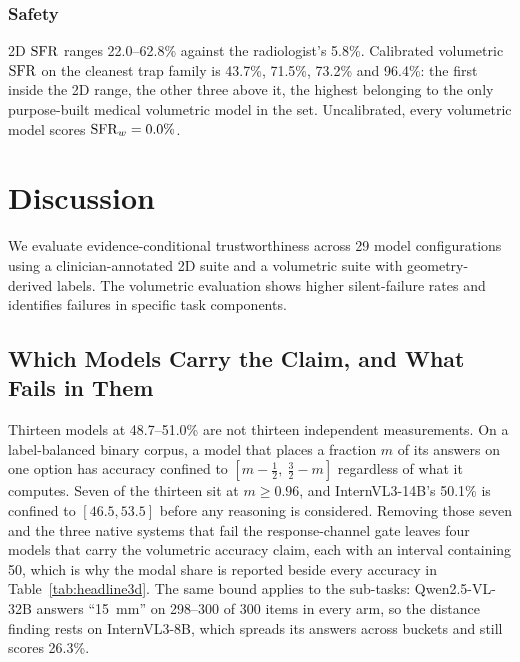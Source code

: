\subsubsection{Safety} 2D $\mathrm{SFR}$ ranges 22.0--62.8\% against the
radiologist's 5.8\%. Calibrated volumetric $\mathrm{SFR}$ on the cleanest trap family
is 43.7\%, 71.5\%, 73.2\% and 96.4\%: the first inside the 2D range, the
other three above it, the highest belonging to the only purpose-built
medical volumetric model in the set. Uncalibrated, every volumetric model
scores $\mathrm{SFR}_{w}=0.0\%$.

\section{Discussion}
\label{sec:discussion}

We evaluate evidence-conditional trustworthiness across 29 model configurations using a clinician-annotated 2D suite and a volumetric suite with geometry-derived labels. The volumetric evaluation shows higher silent-failure rates and identifies failures in specific task components.

\subsection{Which Models Carry the Claim, and What Fails in Them}

Thirteen models at 48.7--51.0\% are not thirteen independent measurements.
On a label-balanced binary corpus, a model that places a fraction $m$ of its
answers on one option has accuracy confined to $[m-\tfrac12,\ \tfrac32-m]$
regardless of what it computes. Seven of the thirteen sit at $m\ge0.96$,
and InternVL3-14B's 50.1\% is confined to $[46.5, 53.5]$ before any
reasoning is considered. Removing those seven and the three native systems that fail the
response-channel gate leaves four models that carry the volumetric accuracy
claim, each with an interval containing 50, which is why the modal share is
reported beside every accuracy in Table~\ref{tab:headline3d}. The same bound
applies to the sub-tasks: Qwen2.5-VL-32B answers ``15~mm'' on 298--300 of
300 items in every arm, so the distance finding rests on InternVL3-8B, which
spreads its answers across buckets and still scores 26.3\%.

